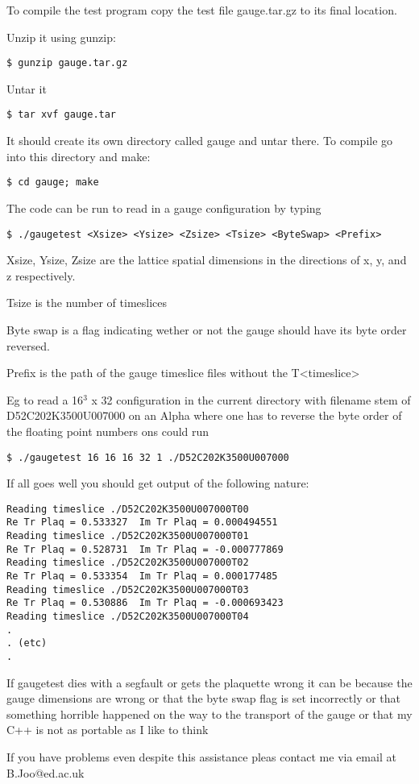 \documentclass[12pt]{article}
\begin{document}
To compile the test program copy  the test file gauge.tar.gz
to its final location.

Unzip it using gunzip:
\begin{verbatim}
$ gunzip gauge.tar.gz
\end{verbatim}
Untar it
\begin{verbatim}
$ tar xvf gauge.tar
\end{verbatim}

It should create its own directory called gauge and untar there.
To compile go into this directory and make:
\begin{verbatim}
$ cd gauge; make
\end{verbatim}
The code can be run to read in a gauge configuration by typing
\begin{verbatim}
$ ./gaugetest <Xsize> <Ysize> <Zsize> <Tsize> <ByteSwap> <Prefix>
\end{verbatim}
Xsize, Ysize, Zsize are the lattice spatial dimensions in the directions 
of x, y, and z respectively.

Tsize is the number of timeslices

Byte swap is a flag indicating wether or not the gauge should have
its byte order reversed.

Prefix is the path of the gauge timeslice files without the T<timeslice>

Eg to read a 16$^3$ x 32 configuration in the current directory 
with filename stem of D52C202K3500U007000 on an Alpha where one has to 
reverse the byte order of the floating point numbers ons could run
\begin{verbatim}
$ ./gaugetest 16 16 16 32 1 ./D52C202K3500U007000
\end{verbatim}
If all goes well you should get output of the following nature:
\begin{verbatim}
Reading timeslice ./D52C202K3500U007000T00
Re Tr Plaq = 0.533327  Im Tr Plaq = 0.000494551
Reading timeslice ./D52C202K3500U007000T01
Re Tr Plaq = 0.528731  Im Tr Plaq = -0.000777869
Reading timeslice ./D52C202K3500U007000T02
Re Tr Plaq = 0.533354  Im Tr Plaq = 0.000177485
Reading timeslice ./D52C202K3500U007000T03
Re Tr Plaq = 0.530886  Im Tr Plaq = -0.000693423
Reading timeslice ./D52C202K3500U007000T04
.
. (etc)
.
\end{verbatim}

If gaugetest dies with a segfault or gets the plaquette wrong it can be 
because the gauge dimensions are wrong or that the byte swap flag is 
set incorrectly or that something horrible happened on the way to the
transport of the gauge or that my C++ is not as portable as I like to think

If you have problems even despite this assistance pleas contact me
via email at B.Joo@ed.ac.uk






\end{document}
